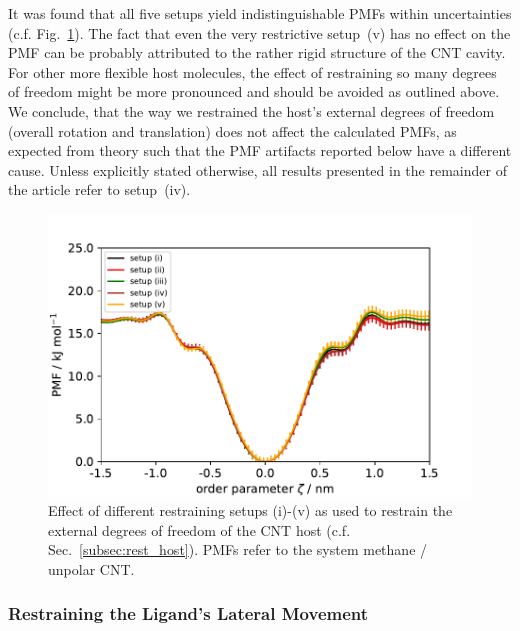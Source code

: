 \documentclass[9pt,lessons,pubversion]{livecoms}
\begin{document}
It was found that all five setups yield indistinguishable PMFs within uncertainties (c.f. Fig.~\ref{fig:study_restr_host}).
The fact that even the very restrictive setup~(v) has no effect on the PMF can be probably attributed to the rather rigid structure of the CNT cavity.
For other more flexible host molecules, the effect of restraining so many degrees of freedom might be more pronounced and should be avoided as outlined above.
We conclude, that the way we restrained the host's external degrees of freedom (overall rotation and translation) does not affect the calculated PMFs, as expected from theory 
such that the PMF artifacts reported below have a different cause.
Unless explicitly stated otherwise, all results presented in the remainder of the article refer to setup~(iv).

\begin{figure}[htb!]
\includegraphics[width=\linewidth]{figures/pmf_uCNT_uMeth_restraining_host.pdf}
\caption{
Effect of different restraining setups (i)-(v) as used to restrain the external degrees of freedom of the CNT host (c.f. Sec.~\ref{subsec:rest_host}). 
PMFs refer to the system methane / unpolar CNT.
}
\label{fig:study_restr_host}
\end{figure}

\subsubsection*{Restraining the Ligand's Lateral Movement}
\end{document}
